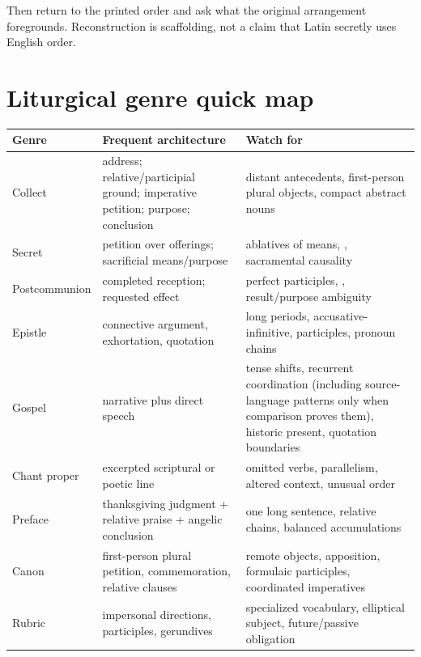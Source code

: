 Then return to the printed order and ask what the original arrangement
foregrounds. Reconstruction is scaffolding, not a claim that Latin secretly
uses English order.

\chapter{Liturgical genre quick map}



\begin{xltabular}{\linewidth}{@{}P{1.4in}P{2.2in}Y@{}}
  \toprule
  \textbf{Genre} & \textbf{Frequent architecture} & \textbf{Watch for} \\
  \midrule\endhead
  Collect & address; relative/participial ground; imperative petition; purpose;
       conclusion & distant antecedents, first-person plural objects, compact
       abstract nouns \\
  Secret & petition over offerings; sacrificial means/purpose & ablatives of
       means, , sacramental causality \\
  Postcommunion & completed reception; requested effect & perfect participles,
       , result/purpose ambiguity \\
  Epistle & connective argument, exhortation, quotation & long periods,
       accusative-infinitive, participles, pronoun chains \\
  Gospel & narrative plus direct speech & tense shifts, recurrent coordination
       (including source-language patterns only when comparison proves them),
       historic present, quotation boundaries \\
  Chant proper & excerpted scriptural or poetic line & omitted verbs,
       parallelism, altered context, unusual order \\
  Preface & thanksgiving judgment + relative praise + angelic conclusion & one
       long sentence, relative chains, balanced accumulations \\
  Canon & first-person plural petition, commemoration, relative clauses & remote
       objects, apposition, formulaic participles, coordinated imperatives \\
  Rubric & impersonal directions, participles, gerundives & specialized
       vocabulary, elliptical subject, future/passive obligation \\
  \bottomrule
\end{xltabular}

